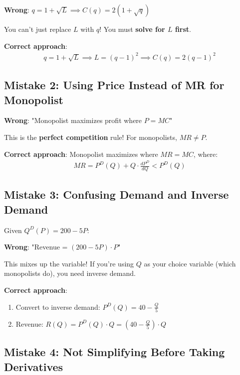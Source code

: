 \documentclass[12pt]{article}
\begin{document}
\begin{warning}
\textbf{Wrong}: $q = 1 + \sqrt{L} \implies C(q) = 2(1 + \sqrt{q})$

You can't just replace $L$ with $q$! You must \textbf{solve for $L$ first}.
\end{warning}

\textbf{Correct approach}:
\begin{align*}
q = 1 + \sqrt{L} \implies L = (q-1)^2 \implies C(q) = 2(q-1)^2
\end{align*}

\subsection{Mistake 2: Using Price Instead of MR for Monopolist}

\begin{warning}
\textbf{Wrong}: "Monopolist maximizes profit where $P = MC$"

This is the \textbf{perfect competition} rule! For monopolists, $MR \neq P$.
\end{warning}

\textbf{Correct approach}: Monopolist maximizes where $MR = MC$, where:
\begin{align*}
MR = P^D(Q) + Q \cdot \frac{dP^D}{dQ} < P^D(Q)
\end{align*}

\subsection{Mistake 3: Confusing Demand and Inverse Demand}

\begin{warning}
Given $Q^D(P) = 200 - 5P$:

\textbf{Wrong}: "Revenue = $(200 - 5P) \cdot P$"

This mixes up the variable! If you're using $Q$ as your choice variable (which monopolists do), you need inverse demand.
\end{warning}

\textbf{Correct approach}:
\begin{enumerate}
\item Convert to inverse demand: $P^D(Q) = 40 - \frac{Q}{5}$
\item Revenue: $R(Q) = P^D(Q) \cdot Q = \left(40 - \frac{Q}{5}\right) \cdot Q$
\end{enumerate}

\subsection{Mistake 4: Not Simplifying Before Taking Derivatives}
\end{document}
